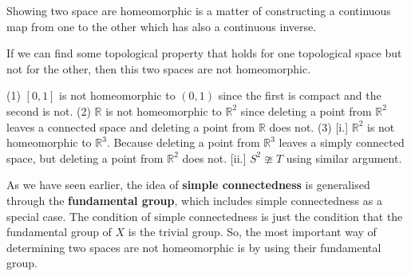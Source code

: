 Showing two space are homeomorphic is a matter of constructing a continuous map from one to the other which has also a continuous inverse.

If we can find some topological property that holds for one topological space but not for the other, then this two spaces are not homeomorphic.

\begin{example}
(1) $[0,1]$ is not homeomorphic to $(0,1)$ since the first is compact and the second is not.
(2) $\mathbb{R}$ is not homeomorphic to $\mathbb{R}^2$ since deleting a point from $\mathbb{R}^2$ leaves a connected space and deleting a point from $\mathbb{R}$ does not.
(3) [i.] $\mathbb{R}^2$ is not homeomorphic to $\mathbb{R}^3$. Because deleting a point from $\mathbb{R}^3$ leaves a simply connected space, but deleting a point from $\mathbb{R}^2$ does not. [ii.] $S^2\ncong T$ using similar argument.
        
\end{example}
As we have seen earlier, the idea of \textbf{simple connectedness} is generalised through the \textbf{fundamental group}, which includes simple connectedness as a special case.
The condition of simple connectedness is just the condition that the fundamental group of $X$ is the trivial group.
So, the most important way of determining two spaces are not homeomorphic is by using their fundamental group.